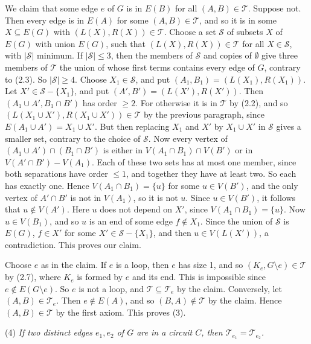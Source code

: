 {We claim that some edge $e$ of $G$ is in $E(B)$ for all $(A, B) \in \mathscr{T}$. Suppose not. Then every edge is in $E(A)$ for some $(A, B) \in \mathscr{T}$, and so it is in some $X \subseteq E(G)$ with $(L(X), R(X)) \in \mathscr{T}$. Choose a set $\mathscr{S}$ of subsets $X$ of $E(G)$ with union $E(G)$, such that $(L(X), R(X)) \in \mathscr{T}$ for all $X \in \mathscr{S}$, with $|\mathscr{S}|$ minimum. If $|\mathscr{S}| \le 3$, then the members of $\mathscr{S}$ and copies of $\emptyset$ give three members of $\mathscr{T}$ the union of whose first terms contains every edge of $G$, contrary to (2.3). So $|\mathscr{S}| \ge 4$. Choose $X_1 \in \mathscr{S}$, and put $(A_1, B_1) = (L(X_1), R(X_1))$. Let $X' \in \mathscr{S} - \{X_1\}$, and put $(A', B') = (L(X'), R(X'))$. Then $(A_1 \cup A', B_1 \cap B')$ has order $\ge 2$. For otherwise it is in $\mathscr{T}$ by (2.2), and so $(L(X_1 \cup X'), R(X_1 \cup X')) \in \mathscr{T}$ by the previous paragraph, since $E(A_1 \cup A') = X_1 \cup X'$. But then replacing $X_1$ and $X'$ by $X_1 \cup X'$ in $\mathscr{S}$ gives a smaller set, contrary to the choice of $\mathscr{S}$. Now every vertex of $(A_1 \cup A') \cap (B_1 \cap B')$ is either in $V(A_1 \cap B_1) \cap V(B')$ or in $V(A' \cap B') - V(A_1)$. Each of these two sets has at most one member, since both separations have order $\le 1$, and together they have at least two. So each has exactly one. Hence $V(A_1 \cap B_1) = \{u\}$ for some $u \in V(B')$, and the only vertex of $A' \cap B'$ is not in $V(A_1)$, so it is not $u$. Since $u \in V(B')$, it follows that $u \notin V(A')$. Here $u$ does not depend on $X'$, since $V(A_1 \cap B_1) = \{u\}$. Now $u \in V(B_1)$, and so $u$ is an end of some edge $f \notin X_1$. Since the union of $\mathscr{S}$ is $E(G)$, $f \in X'$ for some $X' \in \mathscr{S} - \{X_1\}$, and then $u \in V(L(X'))$, a contradiction. This proves our claim.

Choose $e$ as in the claim. If $e$ is a loop, then $e$ has size 1, and so $(K_e, G \setminus e) \in \mathscr{T}$ by (2.7), where $K_e$ is formed by $e$ and its end. This is impossible since $e \notin E(G \setminus e)$. So $e$ is not a loop, and $\mathscr{T} \subseteq \mathscr{T}_e$ by the claim. Conversely, let $(A, B) \in \mathscr{T}_e$. Then $e \notin E(A)$, and so $(B, A) \notin \mathscr{T}$ by the claim. Hence $(A, B) \in \mathscr{T}$ by the first axiom. This proves (3).

\hspace*{12pt}(4) \textit{If two distinct edges $e_1, e_2$ of $G$ are in a circuit $C$, then $\mathscr{T}_{e_1} = \mathscr{T}_{e_2}$.}

}

